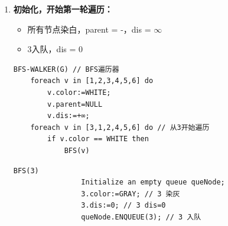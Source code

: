 \documentclass{article}
\begin{document}
\begin{enumerate}
    \item \textbf{初始化，开始第一轮遍历：}

    \begin{itemize}
        \item 所有节点染白，parent = -，dis = $\infty$
        \item 3入队，dis = 0
    \end{itemize}

    \begin{lstlisting}[style=algorithmPPT]
    BFS-WALKER(G) // BFS遍历器
    foreach v in [1,2,3,4,5,6] do
        v.color:=WHITE; 
        v.parent=NULL 
        v.dis:=+∞;
    foreach v in [3,1,2,4,5,6] do // 从3开始遍历
        if v.color == WHITE then
            BFS(v)
        \end{lstlisting}

    \begin{lstlisting}[style=algorithmPPT]
            BFS(3)
                Initialize an empty queue queNode;
                3.color:=GRAY; // 3 染灰
                3.dis:=0; // 3 dis=0
                queNode.ENQUEUE(3); // 3 入队
        \end{lstlisting}

    \begin{figure}[htbp]
        \begin{minipage}[b]{0.6\textwidth}    %
            \centering
\end{minipage}
\end{figure}
\end{enumerate}
\end{document}
